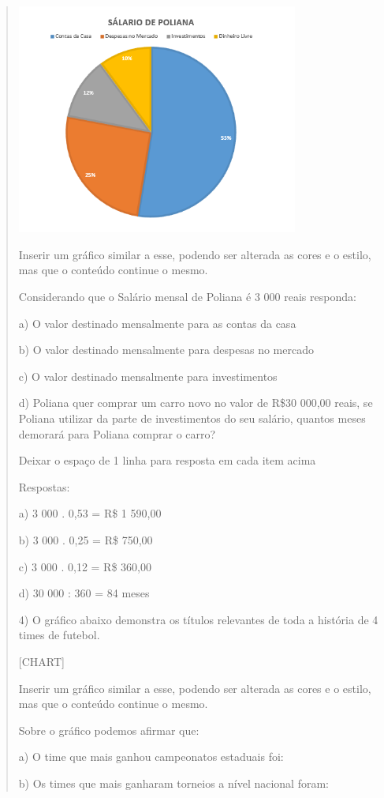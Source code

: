 \begin{quote}
\begin{escolha}
\includegraphics[width=3.65in,height=2.98179in]{./imgSAEB_8_MAT/media/image41.png}

Inserir um gráfico similar a esse, podendo ser alterada as cores e o
estilo, mas que o conteúdo continue o mesmo.

Considerando que o Salário mensal de Poliana é 3 000 reais responda:

a) O valor destinado mensalmente para as contas da casa

b) O valor destinado mensalmente para despesas no mercado

c) O valor destinado mensalmente para investimentos

d) Poliana quer comprar um carro novo no valor de R\$30 000,00 reais, se
Poliana utilizar da parte de investimentos do seu salário, quantos meses
demorará para Poliana comprar o carro?

Deixar o espaço de 1 linha para resposta em cada item acima

Respostas:

a) 3 000 . 0,53 = R\$ 1 590,00

b) 3 000 . 0,25 = R\$ 750,00

c) 3 000 . 0,12 = R\$ 360,00

d) 30 000 : 360 = 84 meses

4) O gráfico abaixo demonstra os títulos relevantes de toda a história
de 4 times de futebol.

{{[}CHART{]}}

Inserir um gráfico similar a esse, podendo ser alterada as cores e o
estilo, mas que o conteúdo continue o mesmo.

Sobre o gráfico podemos afirmar que:

a) O time que mais ganhou campeonatos estaduais foi:

b) Os times que mais ganharam torneios a nível nacional foram:


\end{escolha}
\end{quote}
